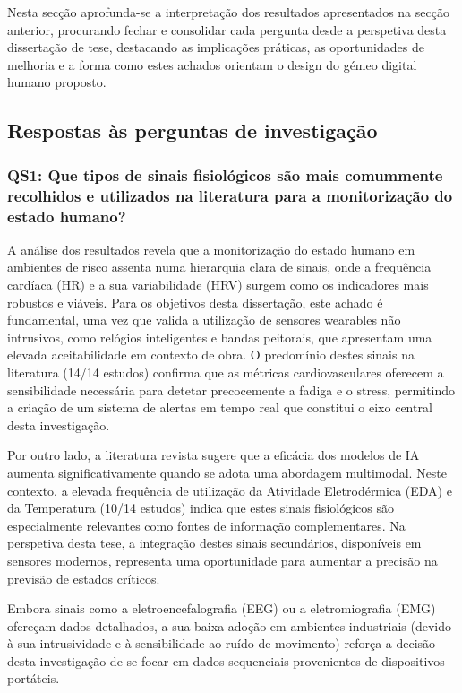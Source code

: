 Nesta secção aprofunda-se a interpretação dos resultados apresentados na secção anterior, procurando fechar e consolidar cada pergunta desde a perspetiva desta dissertação de tese, destacando as implicações práticas, as oportunidades de melhoria e a forma como estes achados orientam o design do gémeo digital humano proposto.

\subsection{Respostas às perguntas de investigação}

\subsubsection*{QS1: Que tipos de sinais fisiológicos são mais comummente recolhidos e utilizados na literatura para a monitorização do estado humano?}
\label{subsubsec:qs1_analisis}

A análise dos resultados revela que a monitorização do estado humano em ambientes de risco assenta numa hierarquia clara de sinais, onde a frequência cardíaca (HR) e a sua variabilidade (HRV) surgem como os indicadores mais robustos e viáveis. Para os objetivos desta dissertação, este achado é fundamental, uma vez que valida a utilização de sensores wearables não intrusivos, como relógios inteligentes e bandas peitorais, que apresentam uma elevada aceitabilidade em contexto de obra. O predomínio destes sinais na literatura (14/14 estudos) confirma que as métricas cardiovasculares oferecem a sensibilidade necessária para detetar precocemente a fadiga e o stress, permitindo a criação de um sistema de alertas em tempo real que constitui o eixo central desta investigação.

Por outro lado, a literatura revista sugere que a eficácia dos modelos de IA aumenta significativamente quando se adota uma abordagem multimodal. Neste contexto, a elevada frequência de utilização da Atividade Eletrodérmica (EDA) e da Temperatura (10/14 estudos) indica que estes sinais fisiológicos são especialmente relevantes como fontes de informação complementares. Na perspetiva desta tese, a integração destes sinais secundários, disponíveis em sensores modernos, representa uma oportunidade para aumentar a precisão na previsão de estados críticos.

Embora sinais como a eletroencefalografia (EEG) ou a eletromiografia (EMG) ofereçam dados detalhados, a sua baixa adoção em ambientes industriais (devido à sua intrusividade e à sensibilidade ao ruído de movimento) reforça a decisão desta investigação de se focar em dados sequenciais provenientes de dispositivos portáteis.

